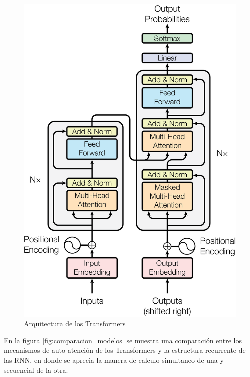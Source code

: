 \begin{figure}[!htbp]
	\centering
	\includegraphics[scale=0.15]{Images & Logos/Transformers.png} 
	\caption{Arquitectura de los Transformers}
	\label{figure:transformers}
\end{figure}

En la figura \ref{fig:comparacion_modelos} se muestra una comparación entre los mecanismos de auto atención de los Transformers y la estructura recurrente de las RNN, en donde se aprecia la manera de calculo simultaneo de una y secuencial de la otra.


